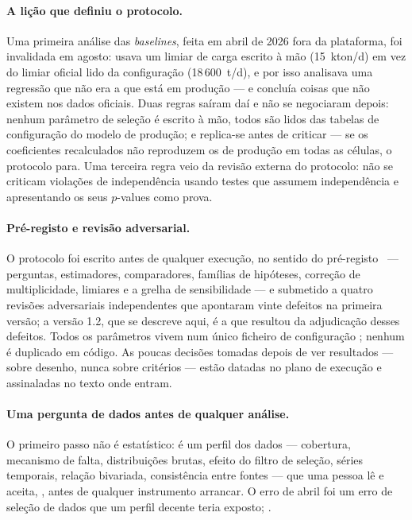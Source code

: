 \paragraph{A lição que definiu o protocolo.} Uma primeira análise das
\emph{baselines}, feita em abril de 2026 fora da plataforma, foi
invalidada em agosto: usava um limiar de carga escrito à mão (15~kton/d)
em vez do limiar oficial lido da configuração (18\,600~t/d), e por isso
analisava uma regressão que não era a que está em produção --- e concluía
coisas que não existem nos dados oficiais. Duas regras saíram daí e não
se negociaram depois: nenhum parâmetro de seleção é escrito à mão, todos
são lidos das tabelas de configuração do modelo de produção; e replica-se
antes de criticar --- se os coeficientes recalculados não reproduzem os de
produção em todas as células, o protocolo para. Uma terceira regra veio da
revisão externa do protocolo: não se criticam violações de independência
usando testes que assumem independência e apresentando os seus
$p$-values como prova.

\paragraph{Pré-registo e revisão adversarial.} O protocolo foi escrito
antes de qualquer execução, no sentido do pré-registo~\cite{Nosek2018} --- perguntas, estimadores, comparadores,
famílias de hipóteses, correção de multiplicidade, limiares e a grelha de
sensibilidade --- e submetido a quatro revisões adversariais independentes
que apontaram vinte defeitos na primeira
versão; a versão 1.2, que se descreve aqui, é a que resultou da
adjudicação desses defeitos. Todos os parâmetros vivem num único ficheiro de
configuração ; nenhum é duplicado em
código. As poucas decisões tomadas depois de ver resultados --- sobre desenho,
nunca sobre critérios --- estão datadas no plano de execução e assinaladas
no texto onde entram.

\paragraph{Uma pergunta de dados antes de qualquer análise.} O primeiro
passo não é estatístico: é um perfil dos dados --- cobertura, mecanismo de
falta, distribuições brutas, efeito do filtro de seleção, séries temporais,
relação bivariada, consistência entre fontes --- que uma pessoa lê e
aceita, , antes de qualquer instrumento arrancar. O erro de abril foi um
erro de seleção de dados que um perfil decente teria exposto; .

